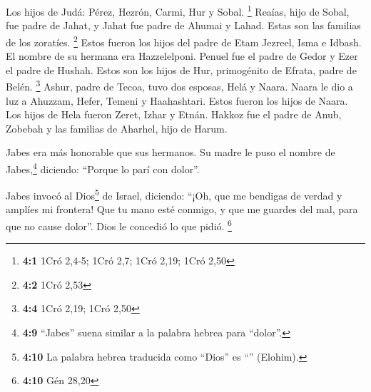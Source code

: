  Los hijos de Judá: Pérez, Hezrón, Carmi, Hur y Sobal.
\footnote{\textbf{4:1} 1Cró 2,4-5; 1Cró 2,7; 1Cró 2,19; 1Cró 2,50}
 Reaías, hijo de Sobal, fue padre de Jahat, y Jahat fue
padre de Ahumai y Lahad. Estas son las familias de los zoratíes.
\footnote{\textbf{4:2} 1Cró 2,53}  Estos fueron los hijos
del padre de Etam Jezreel, Isma e Idbash. El nombre de su hermana era
Hazzelelponi.  Penuel fue el padre de Gedor y Ezer el
padre de Hushah. Estos son los hijos de Hur, primogénito de Efrata,
padre de Belén. \footnote{\textbf{4:4} 1Cró 2,19; 1Cró 2,50}
 Ashur, padre de Tecoa, tuvo dos esposas, Helá y Naara.
 Naara le dio a luz a Ahuzzam, Hefer, Temeni y
Haahashtari. Estos fueron los hijos de Naara.  Los hijos
de Hela fueron Zeret, Izhar y Etnán.  Hakkoz fue el padre
de Anub, Zobebah y las familias de Aharhel, hijo de Harum.

 Jabes era más honorable que sus hermanos. Su madre le
puso el nombre de Jabes,\footnote{\textbf{4:9} ``Jabes'' suena similar a
  la palabra hebrea para ``dolor''.} diciendo: ``Porque lo parí con
dolor''.

 Jabes invocó al Dios\footnote{\textbf{4:10} La palabra
  hebrea traducida como ``Dios'' es ``'' (Elohim).} de
Israel, diciendo: ``¡Oh, que me bendigas de verdad y amplíes mi
frontera! Que tu mano esté conmigo, y que me guardes del mal, para que
no cause dolor''. Dios le concedió lo que pidió. \footnote{\textbf{4:10}
  Gén 28,20}

